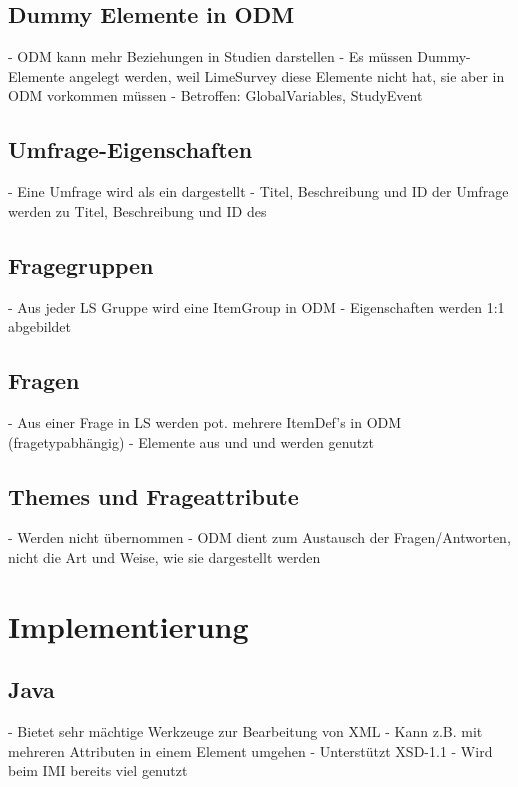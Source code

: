 \subsection{Dummy Elemente in ODM}

- ODM kann mehr Beziehungen in Studien darstellen
- Es müssen Dummy-Elemente angelegt werden, weil LimeSurvey diese Elemente nicht hat, sie aber in ODM vorkommen müssen
- Betroffen: GlobalVariables, StudyEvent

\subsection{Umfrage-Eigenschaften}

- Eine Umfrage wird als ein  dargestellt
- Titel, Beschreibung und ID der Umfrage werden zu Titel, Beschreibung und ID des 

\subsection{Fragegruppen}

- Aus jeder LS Gruppe wird eine ItemGroup in ODM
- Eigenschaften werden 1:1 abgebildet

\subsection{Fragen}

- Aus einer Frage in LS werden pot. mehrere ItemDef's in ODM (fragetypabhängig)
- Elemente aus  und  und  werden genutzt

\subsection{Themes und Frageattribute}

- Werden nicht übernommen
	- ODM dient zum Austausch der Fragen/Antworten, nicht die Art und Weise, wie sie dargestellt werden

\section{Implementierung}

\subsection{Java}

- Bietet sehr mächtige Werkzeuge zur Bearbeitung von XML
	- Kann z.B. mit mehreren Attributen in einem Element umgehen
	- Unterstützt XSD-1.1
- Wird beim IMI bereits viel genutzt

